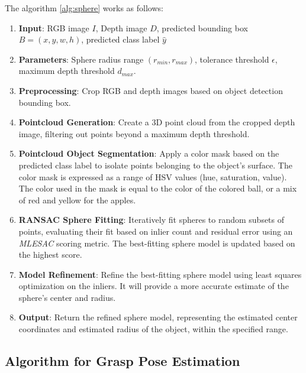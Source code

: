 The algorithm \ref{alg:sphere} works as follows:

\begin{enumerate}
    \item \textbf{Input}: RGB image $I$, Depth image $D$, 
    predicted bounding box $B = (x, y, w, h)$, predicted class label $\hat{y}$
    \item \textbf{Parameters}: Sphere radius range $(r_{min}, r_{max})$, tolerance threshold $\epsilon$,
    maximum depth threshold $d_{max}$.
    \item \textbf{Preprocessing}: Crop RGB and depth images based on object detection bounding box.
    \item \textbf{Pointcloud Generation}: Create a 3D point cloud from the cropped depth image,
    filtering out points beyond a maximum depth threshold.
    \item \textbf{Pointcloud Object Segmentation}: Apply a color mask based on the predicted class label to isolate points
    belonging to the object's surface. The color mask is expressed as a range of HSV values (hue, saturation, value).
    The color used in the mask is equal to the color of the colored ball, or a mix of red and yellow for the apples.
    \item \textbf{RANSAC Sphere Fitting}: Iteratively fit spheres to random subsets of points, evaluating their fit
    based on inlier count and residual error using an \textit{MLESAC} scoring metric. The best-fitting sphere model
    is updated based on the highest score.
    \item \textbf{Model Refinement}: Refine the best-fitting sphere model using least squares optimization on the inliers.
    It will provide a more accurate estimate of the sphere's center and radius.
    \item \textbf{Output}: Return the refined sphere model, representing the estimated center coordinates 
    and estimated radius of the object, within the specified range.
\end{enumerate}


\subsection{Algorithm for Grasp Pose Estimation}

